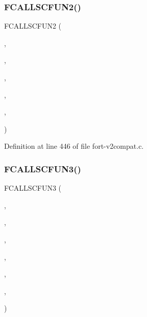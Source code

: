 \subsubsection{\texorpdfstring{F\+C\+A\+L\+L\+S\+C\+F\+U\+N2()}{FCALLSCFUN2()}}
{\footnotesize\ttfamily F\+C\+A\+L\+L\+S\+C\+F\+U\+N2 (\begin{DoxyParamCaption}\item[{\hyperlink{ncfortran_8h_aec6fe8ae8c73cf5133d4ed64f86ff028}{N\+F\+\_\+\+I\+NT}}]{,  }\item[{\hyperlink{nf__v2compat_8c_a7271eb972e4ecfa16690991d83c24b2f}{c\+\_\+nctlen}}]{,  }\item[{N\+C\+T\+L\+EN}]{,  }\item[{\hyperlink{nf__fortv2_8f90_aa66c92465ffab79785ec2fcda51321c1}{nctlen}}]{,  }\item[{T\+Y\+PE}]{,  }\item[{\hyperlink{fort-v2compat_8c_ae2352f39cbd25bcaf1bedbbb12db73fe}{P\+R\+C\+O\+DE}}]{ }\end{DoxyParamCaption})}



Definition at line 446 of file fort-\/v2compat.\+c.

\mbox{\label{fort-v2compat_8c_a3da73ae9b802d64c18e850a7320091a7}} 
\subsubsection{\texorpdfstring{F\+C\+A\+L\+L\+S\+C\+F\+U\+N3()}{FCALLSCFUN3()}\hspace{0.1cm}{\footnotesize\ttfamily [1/4]}}
{\footnotesize\ttfamily F\+C\+A\+L\+L\+S\+C\+F\+U\+N3 (\begin{DoxyParamCaption}\item[{\hyperlink{ncfortran_8h_aec6fe8ae8c73cf5133d4ed64f86ff028}{N\+F\+\_\+\+I\+NT}}]{,  }\item[{\hyperlink{nf__v2compat_8c_af9a99cd260c5779074591f8e55582d26}{c\+\_\+nccre}}]{,  }\item[{N\+C\+C\+RE}]{,  }\item[{\hyperlink{nf__fortv2_8f90_a395384eea56bdad4a53b55df6d6e78d2}{nccre}}]{,  }\item[{S\+T\+R\+I\+NG}]{,  }\item[{\hyperlink{fort-v2compat_8c_abd5253773c995afc2eed8dee4a76a552}{C\+L\+O\+B\+M\+O\+DE}}]{,  }\item[{\hyperlink{fort-v2compat_8c_ae2352f39cbd25bcaf1bedbbb12db73fe}{P\+R\+C\+O\+DE}}]{ }\end{DoxyParamCaption})}



